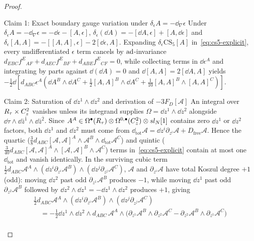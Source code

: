 \begin{proof}\leavevmode
\begin{proofpart}{Claim 1: Exact boundary gauge variation under $\delta_\epsilon A = -\dd_\nabla\epsilon$}
Under $\delta_\epsilon A = -\dd_\nabla\epsilon = -\dd\epsilon - [A,\epsilon]$, $\delta_\epsilon(\dd A) = -[\dd A,\epsilon] + [A,\dd\epsilon]$ and $\delta_\epsilon[A,A] = -[[A,A],\epsilon] - 2[\dd\epsilon,A]$. Expanding $\delta_\epsilon\mathrm{CS}_5[A]$ in~\eqref{eq:cs5-explicit}, every undifferentiated $\epsilon$ term cancels by $\operatorname{ad}$-invariance $d_{EBC}f^E{}_{AF} + d_{AEC}f^E{}_{BF} + d_{ABE}f^E{}_{CF} = 0$, while collecting terms in $\dd\epsilon^A$ and integrating by parts against $\dd(\dd A) = 0$ and $\dd[A,A] = 2[\dd A,A]$ yields $-\frac{1}{2}\dd[d_{ABC}\epsilon^A(\dd A^B\wedge\dd A^C + \frac{1}{2}[A,A]^B\wedge\dd A^C + \frac{1}{10}[A,A]^B\wedge[A,A]^C)]$.
\end{proofpart}
\begin{proofpart}{Claim 2: Saturation of $\dd z^1\wedge\dd z^2$ and derivation of $-3 F_D[\mathcal{A}]$}
An integral over $R_\tau\times C^2_z$ vanishes unless its integrand supplies $\Omega = \dd z^1\wedge\dd z^2$ alongside $\dd\tau\wedge\dd\bar{z}^{\bar{1}}\wedge\dd\bar{z}^{\bar{2}}$. Since $A^A \in \Omega^\bullet(R_\tau)\otimes\Omega^{0,\bullet}(C^2_z)\otimes sl_N[1]$ contains zero $\dd z^1$ or $\dd z^2$ factors, both $\dd z^1$ and $\dd z^2$ must come from $\dd_{\mathrm{tot}}\mathcal{A} = \dd z^i\partial_{z^i}\mathcal{A} + D_{\mathrm{free}}\mathcal{A}$. Hence the quartic ($\frac{3}{8}d_{ABC}[\mathcal{A},\mathcal{A}]^A\wedge\mathcal{A}^B\wedge\dd_{\mathrm{tot}}\mathcal{A}^C$) and quintic ($\frac{3}{40}d_{ABC}[\mathcal{A},\mathcal{A}]^A\wedge[\mathcal{A},\mathcal{A}]^B\wedge\mathcal{A}^C$) terms in~\eqref{eq:cs5-explicit} contain at most one $\dd_{\mathrm{tot}}$ and vanish identically. In the surviving cubic term $\frac{1}{2}d_{ABC}\mathcal{A}^A\wedge(\dd z^i\partial_{z^i}\mathcal{A}^B)\wedge(\dd z^j\partial_{z^j}\mathcal{A}^C)$, $\mathcal{A}$ and $\partial_{z^i}\mathcal{A}$ have total Koszul degree $+1$ (odd): moving $\dd z^2$ past odd $\partial_{z^1}\mathcal{A}^B$ produces $-1$, while moving $\dd z^1$ past odd $\partial_{z^2}\mathcal{A}^B$ followed by $\dd z^2\wedge\dd z^1 = -\dd z^1\wedge\dd z^2$ produces $+1$, giving
\[
\begin{aligned}
&\frac{1}{2}d_{ABC}\mathcal{A}^A\wedge(\dd z^i\partial_{z^i}\mathcal{A}^B)\wedge(\dd z^j\partial_{z^j}\mathcal{A}^C)\\
&\quad = -\frac{1}{2}\dd z^1\wedge\dd z^2\wedge d_{ABC}\,\mathcal{A}^A\wedge\bigl(\partial_{z^1}\mathcal{A}^B\wedge\partial_{z^2}\mathcal{A}^C - \partial_{z^2}\mathcal{A}^B\wedge\partial_{z^1}\mathcal{A}^C\bigr)\\

\end{aligned}\]
\end{proofpart}
\end{proof}
